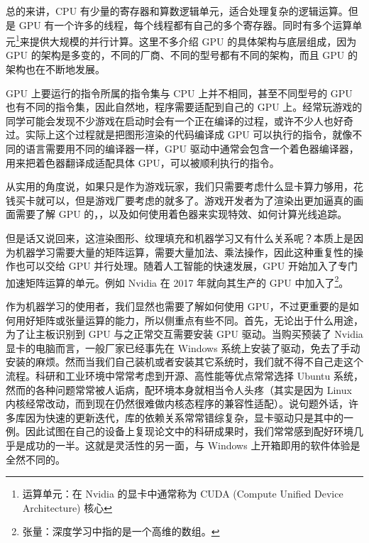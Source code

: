 总的来讲，CPU 有少量的寄存器和算数逻辑单元，适合处理复杂的逻辑运算。但是 GPU 有一个许多的线程，每个线程都有自己的多个寄存器。同时有多个运算单元\footnote{运算单元：在 Nvidia 的显卡中通常称为 CUDA (Compute Unified Device Architecture) 核心}来提供大规模的并行计算。这里不多介绍 GPU 的具体架构与底层组成，因为 GPU 的架构是多变的，不同的厂商、不同的型号都有不同的架构，而且 GPU 的架构也在不断地发展。

GPU 上要运行的指令所属的指令集与 CPU 上并不相同，甚至不同型号的 GPU 也有不同的指令集，因此自然地，程序需要适配到自己的 GPU 上。经常玩游戏的同学可能会发现不少游戏在启动时会有一个正在编译的过程，或许不少人也好奇过。实际上这个过程就是把图形渲染的代码编译成 GPU 可以执行的指令，就像不同的语言需要用不同的编译器一样，GPU 驱动中通常会包含一个着色器编译器，用来把着色器翻译成适配具体 GPU，可以被顺利执行的指令。

从实用的角度说，如果只是作为游戏玩家，我们只需要考虑什么显卡算力够用，花钱买卡就可以，但是游戏厂要考虑的就多了。游戏开发者为了渲染出更加逼真的画面需要了解 GPU 的，，以及如何使用着色器来实现特效、如何计算光线追踪。

但是话又说回来，这渲染图形、纹理填充和机器学习又有什么关系呢？本质上是因为机器学习需要大量的矩阵运算，需要大量加法、乘法操作，因此这种重复性的操作也可以交给 GPU 并行处理。随着人工智能的快速发展，GPU 开始加入了专门加速矩阵运算的单元。例如 Nvidia 在 2017 年就向其生产的 GPU 中加入了\footnote{张量：深度学习中指的是一个高维的数组。}。

作为机器学习的使用者，我们显然也需要了解如何使用 GPU，不过更重要的是如何用好矩阵或张量运算的能力，所以侧重点有些不同。首先，无论出于什么用途，为了让主板识别到 GPU 与之正常交互需要安装 GPU 驱动。当购买预装了 Nvidia 显卡的电脑而言，一般厂家已经事先在 Windows 系统上安装了驱动，免去了手动安装的麻烦。然而当我们自己装机或者安装其它系统时，我们就不得不自己走这个流程。科研和工业环境中常常考虑到开源、高性能等优点常常选择 Ubuntu 系统，然而的各种问题常常被人诟病，配环境本身就相当令人头疼（其实是因为 Linux 内核经常改动，而到现在仍然很难做内核态程序的兼容性适配）。说句题外话，许多库因为快速的更新迭代，库的依赖关系常常错综复杂，显卡驱动只是其中的一例。因此试图在自己的设备上复现论文中的科研成果时，我们常常感到配好环境几乎是成功的一半。这就是灵活性的另一面，与 Windows 上开箱即用的软件体验是全然不同的。

